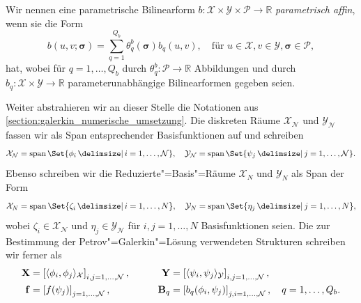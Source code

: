 \documentclass[../main.tex]{subfiles}
\begin{document}
\begin{Definition}
\label{definition:parametrisch_affine_bf_fuer_rbm}
    Wir nennen eine parametrische Bilinearform $b \colon \mathcal X \times \mathcal Y \times \mathcal P \to \mathbb{R}$ \emph{parametrisch affin}, wenn sie die Form
    \begin{equation}
        b(u, v; \bm \sigma) = \sum_{q = 1}^{Q_{b}} \theta_{q}^{b}(\bm \sigma) b_{q}(u, v), \quad \text{für } u \in \mathcal X, v \in \mathcal Y, \bm \sigma \in \mathcal P,
    \end{equation}
    hat, wobei für $q = 1, \dots, Q_{b}$ durch $\theta_{q}^{b} \colon \mathcal P \to \mathbb{R}$ Abbildungen und durch $b_{q} \colon \mathcal X \times \mathcal Y \to \mathbb{R}$ parameterunabhängige Bilinearformen gegeben seien.
\end{Definition}

Weiter abstrahieren wir an dieser Stelle die Notationen aus \cref{section:galerkin_numerische_umsetzung}.
Die diskreten Räume $\mathcal X_{\mathcal N}$ und $\mathcal Y_{\mathcal N}$ fassen wir als Span entsprechender Basisfunktionen auf und schreiben
\begin{equation}
    \mathcal X_{\mathcal N} = \spn \Set{ \phi_{i} \given i = 1, \dots, \mathcal N },
    \quad
    \mathcal Y_{\mathcal N} = \spn \Set{ \psi_{j} \given j = 1, \dots, \mathcal N }.
\end{equation}
Ebenso schreiben wir die Reduzierte"=Basis"=Räume $\mathcal X_{N}$ und $\mathcal Y_{N}$ als Span der Form
\begin{equation}
    \mathcal X_{N} = \spn \Set{ \zeta_{i} \given i = 1, \dots, N},
    \quad
    \mathcal Y_{N} = \spn \Set{ \eta_{j} \given j = 1, \dots, N},
\end{equation}
wobei $\zeta_{i} \in \mathcal X_{\mathcal N}$ und $\eta_{j} \in \mathcal Y_{\mathcal N}$ für $i, j = 1, \dots, N$ Basisfunktionen seien.
Die zur Bestimmung der Petrov"=Galerkin"=Lösung verwendeten Strukturen schreiben wir ferner als
\begin{equation}
    \begin{aligned}
        \mathbf{X} &= \left[ \langle\phi_{i},\phi_{j}\rangle_{\mathcal X} \right]_{i,j = 1, \dots, \mathcal N},
        &\qquad
        \mathbf{Y} &= \left[ \langle\psi_{i},\psi_{j}\rangle_{\mathcal Y} \right]_{i,j = 1, \dots, \mathcal N},
        \\
        \mathbf{f} &= \left[ f(\psi_{j}) \right]_{j = 1, \dots, \mathcal N},
        &\qquad
        \mathbf{B}_{q} &= \left[ b_{q}(\phi_{i}, \psi_{j}) \right]_{j,i = 1, \dots, \mathcal N}, \quad q = 1, \dots, Q_{b}.
    \end{aligned}
\end{equation}
\end{document}
